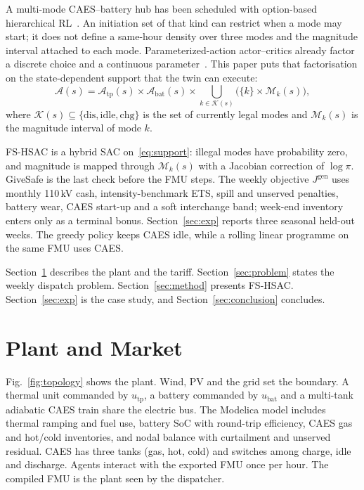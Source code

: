 \documentclass[conference]{IEEEtran}
\begin{document}
A multi-mode CAES--battery hub has been scheduled with option-based hierarchical RL~\cite{cui2024caesbess}. An initiation set of that kind can restrict when a mode may start; it does not define a same-hour density over three modes and the magnitude interval attached to each mode. Parameterized-action actor--critics already factor a discrete choice and a continuous parameter~\cite{fan2019hybrid}. This paper puts that factorisation on the state-dependent support that the twin can execute:
\begin{equation}
\mathcal{A}(s)
=
\mathcal{A}_{\mathrm{tp}}(s)\times
\mathcal{A}_{\mathrm{bat}}(s)\times
\bigcup_{k\in\mathcal{K}(s)}
\bigl(\{k\}\times\mathcal{M}_k(s)\bigr),
\label{eq:support}
\end{equation}
where \(\mathcal{K}(s)\subseteq\{\mathrm{dis},\mathrm{idle},\mathrm{chg}\}\) is the set of currently legal modes and \(\mathcal{M}_k(s)\) is the magnitude interval of mode \(k\).

FS-HSAC is a hybrid SAC on~\eqref{eq:support}: illegal modes have probability zero, and magnitude is mapped through \(\mathcal{M}_k(s)\) with a Jacobian correction of \(\log\pi\). GiveSafe is the last check before the FMU steps. The weekly objective \(J^{\mathrm{gen}}\) uses monthly 110\,kV cash, intensity-benchmark ETS, spill and unserved penalties, battery wear, CAES start-up and a soft interchange band; week-end inventory enters only as a terminal bonus. Section~\ref{sec:exp} reports three seasonal held-out weeks. The greedy policy keeps CAES idle, while a rolling linear programme on the same FMU uses CAES.

Section~\ref{sec:plant} describes the plant and the tariff. Section~\ref{sec:problem} states the weekly dispatch problem. Section~\ref{sec:method} presents FS-HSAC. Section~\ref{sec:exp} is the case study, and Section~\ref{sec:conclusion} concludes.

\section{Plant and Market}
\label{sec:plant}

Fig.~\ref{fig:topology} shows the plant. Wind, PV and the grid set the boundary. A thermal unit commanded by \(u_{\mathrm{tp}}\), a battery commanded by \(u_{\mathrm{bat}}\) and a multi-tank adiabatic CAES train share the electric bus. The Modelica model includes thermal ramping and fuel use, battery SoC with round-trip efficiency, CAES gas and hot/cold inventories, and nodal balance with curtailment and unserved residual. CAES has three tanks (gas, hot, cold) and switches among charge, idle and discharge. Agents interact with the exported FMU once per hour. The compiled FMU is the plant seen by the dispatcher.
\end{document}

